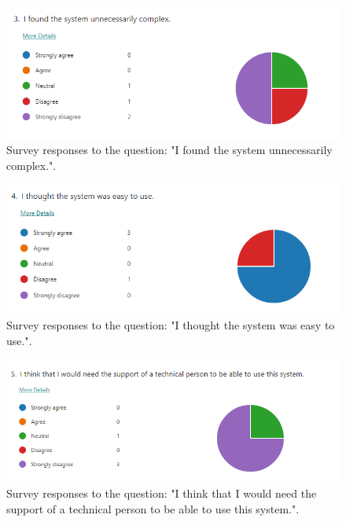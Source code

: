 \documentclass{l4proj}
\begin{document}
\begin{appendices}
\begin{figure}[h]
    \centering
    \includegraphics[width=0.9\linewidth]{images/usability2.png}    

    \caption{Survey responses to the question: "I found the system unnecessarily complex.".}
    \label{fig:usability2} 
\end{figure}

\begin{figure}[h]
    \centering
    \includegraphics[width=0.9\linewidth]{images/usability3.png}    

    \caption{Survey responses to the question: "I thought the system was easy to use.".}
    \label{fig:usability3} 
\end{figure}

\begin{figure}[h]
    \centering
    \includegraphics[width=0.9\linewidth]{images/usability4.png}    

    \caption{Survey responses to the question: "I think that I would need the support of a technical person to be able to use this system.".}
    \label{fig:usability4} 
\end{figure}


\end{appendices}
\end{document}

